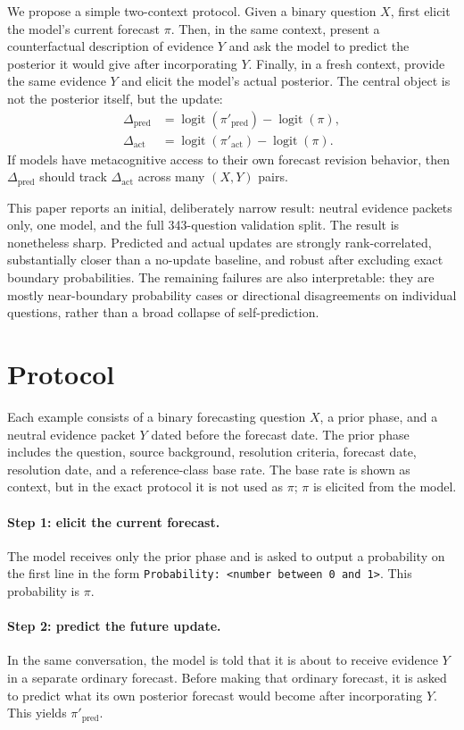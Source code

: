 \documentclass[11pt]{article}
\newcommand{\logit}{\operatorname{logit}}
\newcommand{\pred}{\mathrm{pred}}
\newcommand{\act}{\mathrm{act}}
\begin{document}
We propose a simple two-context protocol. Given a binary question $X$, first
elicit the model's current forecast $\pi$. Then, in the same context, present a
counterfactual description of evidence $Y$ and ask the model to predict the
posterior it would give after incorporating $Y$. Finally, in a fresh context,
provide the same evidence $Y$ and elicit the model's actual posterior. The
central object is not the posterior itself, but the update:
\begin{align}
  \Delta_{\pred} &= \logit(\pi'_{\pred}) - \logit(\pi),\\
  \Delta_{\act} &= \logit(\pi'_{\act}) - \logit(\pi).
\end{align}
If models have metacognitive access to their own forecast revision behavior,
then $\Delta_{\pred}$ should track $\Delta_{\act}$ across many $(X,Y)$ pairs.

This paper reports an initial, deliberately narrow result: neutral evidence
packets only, one model, and the full 343-question validation split. The result is nonetheless
sharp. Predicted and actual updates are strongly rank-correlated, substantially
closer than a no-update baseline, and robust after excluding exact boundary
probabilities. The remaining failures are also interpretable: they are mostly near-boundary
probability cases or directional disagreements on individual questions, rather
than a broad collapse of self-prediction.

\section{Protocol}

Each example consists of a binary forecasting question $X$, a prior phase, and
a neutral evidence packet $Y$ dated before the forecast date. The prior phase
includes the question, source background, resolution criteria, forecast date,
resolution date, and a reference-class base rate. The base rate is shown as
context, but in the exact protocol it is not used as $\pi$; $\pi$ is elicited
from the model.

\paragraph{Step 1: elicit the current forecast.}
The model receives only the prior phase and is asked to output a probability on
the first line in the form \texttt{Probability: <number between 0 and 1>}. This
probability is $\pi$.

\paragraph{Step 2: predict the future update.}
In the same conversation, the model is told that it is about to receive evidence
$Y$ in a separate ordinary forecast. Before making that ordinary forecast, it is
asked to predict what its own posterior forecast would become after
incorporating $Y$. This yields $\pi'_{\pred}$.
\end{document}
